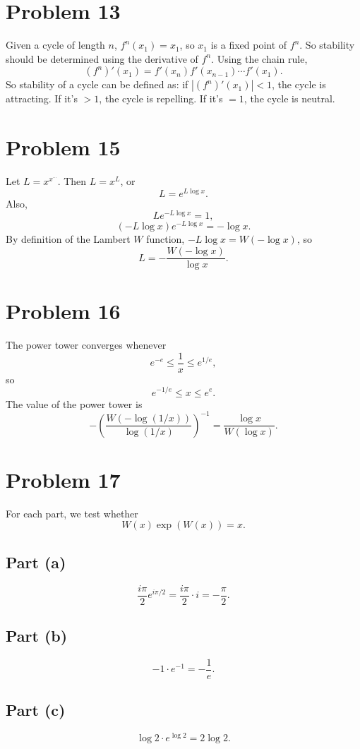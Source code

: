 \documentclass{article}
\newcommand{\bigp}[1]{\left(#1\right)}
\begin{document}
\section*{Problem 13}
Given a cycle of length $n$, $f^n(x_1) = x_1$, so $x_1$ is a fixed point of $f^n$. So stability should be determined using the derivative of $f^n$. Using the chain rule,
$$(f^n)'(x_1) = f'(x_n)f'(x_{n - 1}) \cdots f'(x_1).$$
So stability of a cycle can be defined as: if $|(f^n)'(x_1)| < 1$, the cycle is attracting. If it's $> 1$, the cycle is repelling. If it's $= 1$, the cycle is neutral.

\section*{Problem 15}
Let $L = x^{x^{\cdots}}$. Then $L = x^L$, or
$$L = e^{L\log x}.$$
Also,
$$Le^{-L\log x} = 1,$$
$$(-L\log x)e^{-L\log x} = -\log x.$$
By definition of the Lambert $W$ function, $-L\log x = W(-\log x)$, so
$$L = -\frac{W(-\log x)}{\log x}.$$

\section*{Problem 16}
The power tower converges whenever
$$e^{-e} \le \frac{1}{x} \le e^{1/e},$$
so
$$e^{-1/e} \le x \le e^e.$$
The value of the power tower is
$$-\bigp{\frac{W(-\log (1/x))}{\log (1/x)}}^{-1} = \frac{\log x}{W(\log x)}.$$

\section*{Problem 17}
For each part, we test whether
$$W(x)\exp(W(x)) = x.$$
\subsection*{Part (a)}
$$\frac{i\pi}{2}e^{i\pi/2} = \frac{i\pi}{2}\cdot i = -\frac{\pi}{2}.$$
\subsection*{Part (b)}
$$-1 \cdot e^{-1} = -\frac{1}{e}.$$
\subsection*{Part (c)}
$$\log 2 \cdot e^{\log 2} = 2\log 2.$$
\end{document}
